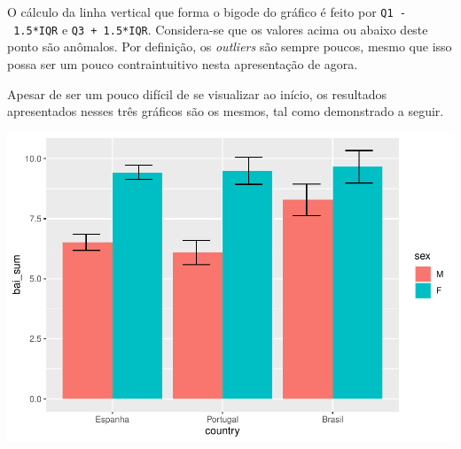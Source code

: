 \documentclass[
]{book}
\newenvironment{Shaded}{\begin{snugshade}}{\end{snugshade}}
\newcommand{\CommentTok}[1]{\textcolor[rgb]{0.56,0.35,0.01}{\textit{#1}}}
\newcommand{\DataTypeTok}[1]{\textcolor[rgb]{0.13,0.29,0.53}{#1}}
\newcommand{\DecValTok}[1]{\textcolor[rgb]{0.00,0.00,0.81}{#1}}
\newcommand{\FloatTok}[1]{\textcolor[rgb]{0.00,0.00,0.81}{#1}}
\newcommand{\KeywordTok}[1]{\textcolor[rgb]{0.13,0.29,0.53}{\textbf{#1}}}
\newcommand{\NormalTok}[1]{#1}
\newcommand{\OperatorTok}[1]{\textcolor[rgb]{0.81,0.36,0.00}{\textbf{#1}}}
\newcommand{\StringTok}[1]{\textcolor[rgb]{0.31,0.60,0.02}{#1}}
\begin{document}
O cálculo da linha vertical que forma o bigode do gráfico é feito por
\texttt{Q1\ -\ 1.5*IQR} e \texttt{Q3\ +\ 1.5*IQR}. Considera-se que os
valores acima ou abaixo deste ponto são anômalos. Por definição, os
\emph{outliers} são sempre poucos, mesmo que isso possa ser um pouco
contraintuitivo nesta apresentação de agora.

Apesar de ser um pouco difícil de se visualizar ao início, os resultados
apresentados nesses três gráficos são os mesmos, tal como demonstrado a
seguir.

\begin{Shaded}
\end{Shaded}

\begin{center}\includegraphics{gitbook-demo_files/figure-latex/unnamed-chunk-25-1} \end{center}
\end{document}
